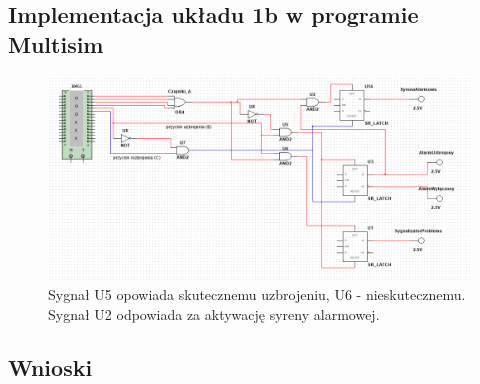 \documentclass{article}
\begin{document}
\subsection{Implementacja układu 1b w programie Multisim}
\begin{figure}[h!]
\includegraphics[width=\textwidth]{1b}
\caption{Sygnał U5 opowiada skutecznemu uzbrojeniu, U6 - nieskutecznemu. Sygnał U2 odpowiada za aktywację syreny alarmowej.}
\end{figure}
\subsection{Wnioski}
\end{document}
